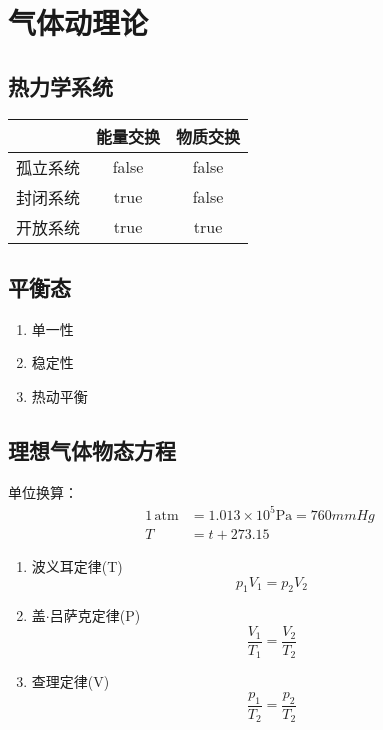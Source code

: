 \chapter{气体动理论}

\newpage

\section{热力学系统}

\begin{table}[!htbp]
    \centering
    \begin{tabular}{lcc}
        \toprule
                 & 能量交换 & 物质交换 \\
        \midrule
        孤立系统 & false    & false    \\
        封闭系统 & true     & false    \\
        开放系统 & true     & true     \\
        \bottomrule
    \end{tabular}
\end{table}

\section{平衡态}

\begin{enumerate}
    \item 单一性
    \item 稳定性
    \item 热动平衡
\end{enumerate}

\section{理想气体物态方程}

单位换算：
\begin{equation}
    \begin{aligned}
        1\,\mathrm{atm} & = 1.013\times10^5 \mathrm{Pa} = 760mmHg \\
        T               & =t+273.15
    \end{aligned}
\end{equation}

\begin{enumerate}
    \item 波义耳定律(T)
          \begin{equation}
              p_1V_1=p_2V_2
          \end{equation}
    \item 盖$\cdot$吕萨克定律(P)
          \begin{equation}
              \frac{V_1}{T_1}=\frac{V_2}{T_2}
          \end{equation}
    \item 查理定律(V)
          \begin{equation}
              \frac{p_1}{T_2}=\frac{p_2}{T_2}
          \end{equation}
\end{enumerate}

